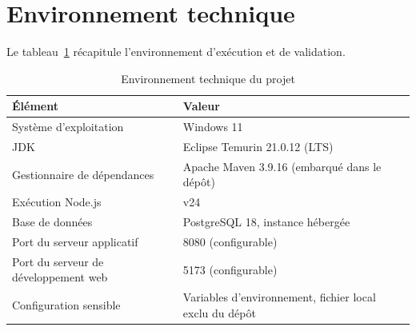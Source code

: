 \section{Environnement technique}

Le tableau~\ref{tab:env} récapitule l'environnement d'exécution et de validation.

\begin{table}[H]
\centering
\caption{Environnement technique du projet}
\label{tab:env}
\small
\begin{tabularx}{\textwidth}{@{}p{4.3cm}X@{}}
\toprule
\textbf{Élément} & \textbf{Valeur} \\
\midrule
Système d'exploitation & Windows 11 \\
JDK & Eclipse Temurin 21.0.12 (LTS) \\
Gestionnaire de dépendances & Apache Maven 3.9.16 (embarqué dans le dépôt) \\
Exécution Node.js & v24 \\
Base de données & PostgreSQL 18, instance hébergée \\
Port du serveur applicatif & 8080 (configurable) \\
Port du serveur de développement web & 5173 (configurable) \\
Configuration sensible & Variables d'environnement, fichier local exclu du dépôt \\
\bottomrule
\end{tabularx}
\end{table}
